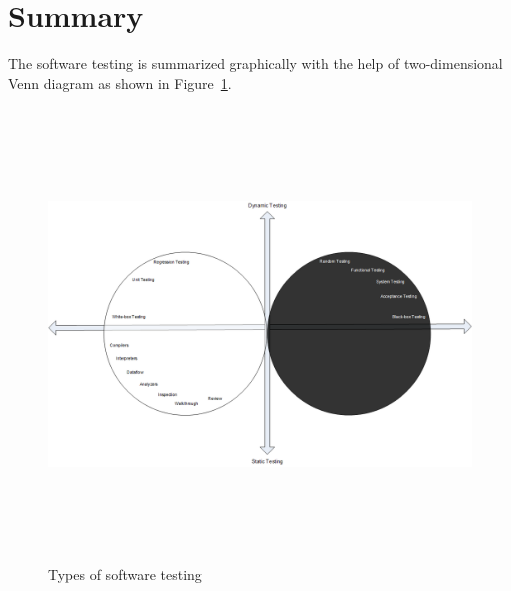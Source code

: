 



\section{Summary}
The software testing is summarized graphically with the help of two-dimensional Venn diagram as shown in Figure~\ref{fig:testDataGenerators_2}. 

\bigskip
\begin{figure}[h]
	\centering
	\centerline{\includegraphics[width=16cm, height=12cm ]{chapter2/DrawingTesting.png}}
	\bigskip
	\caption{Types of software testing}
	\label{fig:testDataGenerators_2}
\end{figure}
\bigskip

